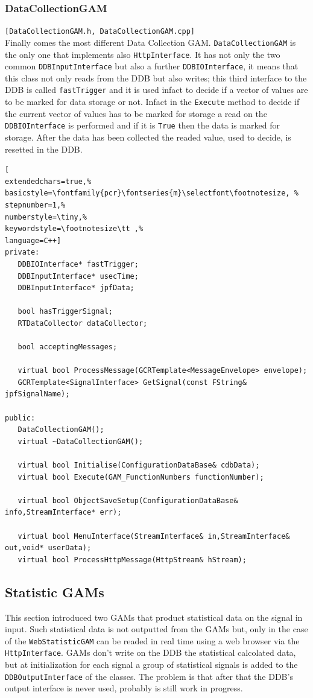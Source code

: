 \subsubsection{DataCollectionGAM}
\texttt{[DataCollectionGAM.h, DataCollectionGAM.cpp]}\\
Finally comes the most different Data Collection GAM. \texttt{DataCollectionGAM} is the only one that implements also \texttt{HttpInterface}. It has not only the two common \texttt{DDBInputInterface} but also a further \texttt{DDBIOInterface}, it means that this class not only reads from the DDB but also writes; this third interface to the DDB is called \texttt{fastTrigger} and it is used infact to decide if a vector of values are to be marked for data storage or not. Infact in the \texttt{Execute} method to decide if the current vector of values has to be marked for storage a read on the \texttt{DDBIOInterface} is performed and if it is \texttt{True} then the data is marked for storage. After the data has been collected the readed value, used to decide, is resetted in the DDB.

\begin{lstlisting}[
extendedchars=true,%
basicstyle=\fontfamily{pcr}\fontseries{m}\selectfont\footnotesize, %
stepnumber=1,%
numberstyle=\tiny,%
keywordstyle=\footnotesize\tt ,%
language=C++]
private:
   DDBIOInterface* fastTrigger;
   DDBInputInterface* usecTime;
   DDBInputInterface* jpfData;

   bool hasTriggerSignal;
   RTDataCollector dataCollector;

   bool acceptingMessages;

   virtual bool ProcessMessage(GCRTemplate<MessageEnvelope> envelope);
   GCRTemplate<SignalInterface> GetSignal(const FString& jpfSignalName);

public:
   DataCollectionGAM();
   virtual ~DataCollectionGAM();

   virtual bool Initialise(ConfigurationDataBase& cdbData);
   virtual bool Execute(GAM_FunctionNumbers functionNumber);

   virtual bool ObjectSaveSetup(ConfigurationDataBase& info,StreamInterface* err);

   virtual bool MenuInterface(StreamInterface& in,StreamInterface& out,void* userData);
   virtual bool ProcessHttpMessage(HttpStream& hStream);
\end{lstlisting}



\subsection{Statistic GAMs}
This section introduced two GAMs that product statistical data on the signal in input. Such statistical data is not outputted from the GAMs but, only in the case of the \texttt{WebStatisticGAM} can be readed in real time using a web browser via the \texttt{HttpInterface}. GAMs don't write on the DDB the statistical calcolated data, but at initialization for each signal a group of statistical signals is added to the \texttt{DDBOutputInterface} of the classes. The problem is that after that the DDB's output interface is never used, probably is still work in progress. \\

